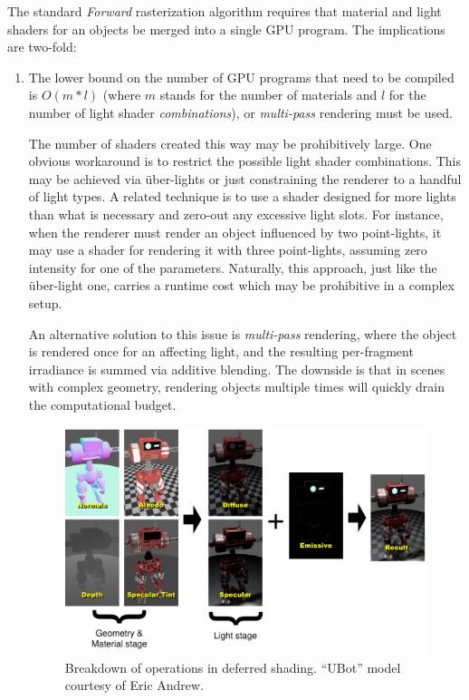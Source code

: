 The standard \emph{Forward} rasterization algorithm requires that material and light shaders for an objects be merged into a single GPU program. The implications are two-fold:
\begin{enumerate}
\item The lower bound on the number of GPU programs that need to be compiled is $O(m * l)$ (where $m$ stands for the number of materials and $l$ for the number of light shader \emph{combinations}), or \emph{multi-pass} rendering must be used.

The number of shaders created this way may be prohibitively large. One obvious workaround is to restrict the possible light shader combinations. This may be achieved via über-lights \cite{UberLights, UberLightsCg} or just constraining the renderer to a handful of light types. A related technique is to use a shader designed for more lights than what is necessary and zero-out any excessive light slots. For instance, when the renderer must render an object influenced by two point-lights, it may use a shader for rendering it with three point-lights, assuming zero intensity for one of the parameters. Naturally, this approach, just like the über-light one, carries a runtime cost which may be prohibitive in a complex setup.

An alternative solution to this issue is \emph{multi-pass} rendering, where the object is rendered once for an affecting light, and the resulting per-fragment irradiance is summed via additive blending. The downside is that in scenes with complex geometry, rendering objects multiple times will quickly drain the computational budget.

\begin{figure}[h!]
  \centering
    \includegraphics[width=0.9\linewidth]{./Figures/deferredComposition/deferredComposition.pdf}
    \caption[Deferred shading pipeline]{Breakdown of operations in deferred shading. ``UBot'' model courtesy of Eric Andrew.}
  \label{fig:DeferredComposition}
\end{figure}


\end{enumerate}
